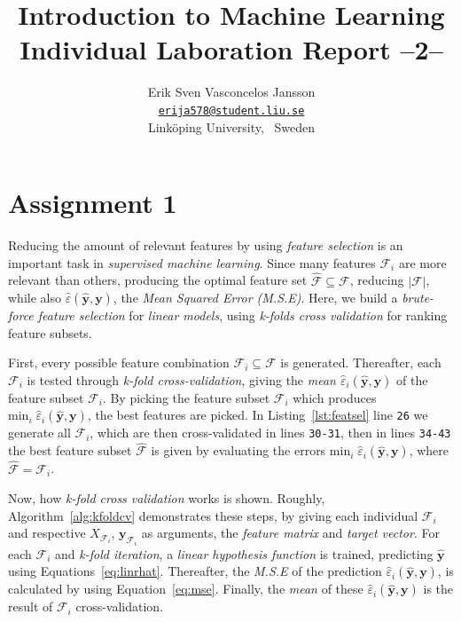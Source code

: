 \documentclass[a4paper, twocolumn]{article}
\title{Introduction to Machine Learning \\
       Individual Laboration Report --2--}
\author{{Erik Sven Vasconcelos Jansson} \\
        {\href{mailto:erija578@student.liu.se}
        {\texttt{erija578@student.liu.se}}} \\
        {Linköping University, \, Sweden}}
\begin{document}
    \maketitle %

    \section*{Assignment 1}

    Reducing the amount of relevant features by using \emph{feature selection} is an important task in \emph{supervised machine learning}. Since many features $\mathcal{F}_i$ are more relevant than others, producing the optimal feature set $\mathcal{\hat{F}} \subseteq \mathcal{F}$, reducing $|\mathcal{F}|$, while also $\hat{\varepsilon}(\mathbf{\hat{y}}, \mathbf{y})$, the \emph{Mean Squared Error (M.S.E)}. Here, we build a \emph{brute-force feature selection} for \emph{linear models}, using \emph{k-folds cross validation} for ranking feature subsets.

    First, every possible feature combination $\mathcal{F}_i \subseteq \mathcal{F}$ is generated. Thereafter, each $\mathcal{F}_i$ is tested through \emph{k-fold cross-validation}, giving the \emph{mean $\hat{\varepsilon}_i(\mathbf{\hat{y}}, \mathbf{y})$} of the feature subset $\mathcal{F}_i$. By picking the feature subset $\mathcal{F}_i$ which produces $\mathrm{min}_i\; \hat{\varepsilon}_i(\mathbf{\hat{y}}, \mathbf{y})$, the best features are picked. In Listing~\ref{lst:featsel} line \texttt{26} we generate all $\mathcal{F}_i$, which are then cross-validated in lines \texttt{30-31}, then in lines \texttt{34-43} the best feature subset $\hat{\mathcal{F}}$ is given by evaluating the errors $\mathrm{min}_i\; \hat{\varepsilon}_i(\mathbf{\hat{y}}, \mathbf{y})$, where $\hat{\mathcal{F}} = \mathcal{F}_i$.

    Now, how \emph{k-fold cross validation} works is shown. Roughly, Algorithm~\ref{alg:kfoldcv} demonstrates these steps, by giving each individual $\mathcal{F}_i$ and respective $X_{\mathcal{F}_i}$, $\mathbf{y}_{\mathcal{F}_i}$ as arguments, the \emph{feature matrix} and \emph{target vector}. For each $\mathcal{F}_i$ and \emph{k-fold iteration}, a \emph{linear hypothesis function} is trained, predicting $\hat{\mathbf{y}}$ using Equations~\ref{eq:linrhat}. Thereafter, the \emph{M.S.E} of the prediction $\hat{\varepsilon}_i(\mathbf{\hat{y}}, \mathbf{y})$, is calculated by using Equation~\ref{eq:mse}. Finally, the \emph{mean} of these $\hat{\varepsilon}_i(\mathbf{\hat{y}}, \mathbf{y})$ is the result of $\mathcal{F}_i$ cross-validation.
\end{document}
